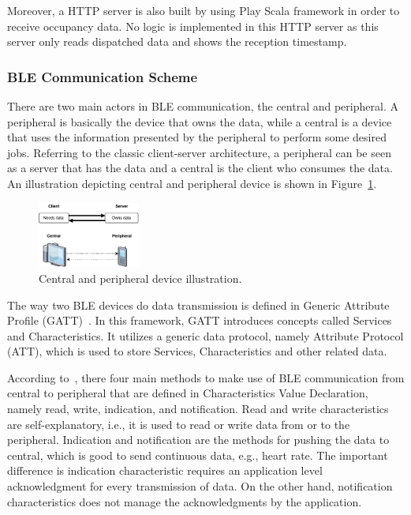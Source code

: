 \documentclass[journal]{vgtc}                %
\begin{document}
Moreover, a HTTP server is also built by using Play Scala framework in order to receive occupancy data. No logic is implemented in this HTTP server as this server only reads dispatched data and shows the reception timestamp.



\subsubsection{BLE Communication Scheme} %
\label{ssub:ble_communication_scheme}
There are two main actors in BLE communication, the central and peripheral.  A peripheral is basically the device that owns the data, while a central is a device that uses the information presented by the peripheral to perform some desired jobs. Referring to the classic client-server architecture, a peripheral can be seen as a server that has the data and a central is the client who consumes the data. An illustration depicting central and peripheral device is shown in Figure~\ref{fig:central-peripheral}.

\begin{figure}[h!]
  \centering
    \includegraphics[width=0.3\textwidth]{central-peripheral}
  \caption{Central and peripheral device illustration.}
  \label{fig:central-peripheral}
\end{figure}

The way two BLE devices do data transmission is defined in Generic Attribute Profile (GATT)~\cite{BluetoothSpecialInterestGroup2014}. In this framework, GATT introduces concepts called Services and Characteristics. It utilizes a generic data protocol, namely Attribute Protocol (ATT), which is used to store Services, Characteristics and other related data.

According to~\cite{BluetoothSpecialInterestGroup2014}, there four main methods to make use of BLE communication from central to peripheral that are defined in Characteristics Value Declaration, namely read, write, indication, and notification. Read and write characteristics are self-explanatory, i.e., it is used to read or write data from or to the peripheral. Indication and notification are the methods for pushing the data to central, which is good to send continuous data, e.g., heart rate. The important difference is indication characteristic requires an application level acknowledgment for every transmission of data. On the other hand, notification characteristics does not manage the acknowledgments by the application.
\end{document}
